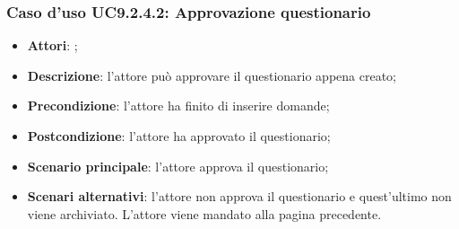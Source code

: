 			\subsubsection{Caso d'uso UC9.2.4.2: Approvazione questionario}
			\label{UC9.2.4.2}
			\begin{itemize}
				\item \textbf{Attori}: \uaupro{};
				\item \textbf{Descrizione}: l'attore può approvare il questionario appena creato;
				\item \textbf{Precondizione}:  l'attore ha finito di inserire domande;
				\item \textbf{Postcondizione}: l'attore ha approvato il questionario;
				\item \textbf{Scenario principale}: l'attore approva il questionario;
				\item \textbf{Scenari alternativi}: l'attore non approva il questionario e quest'ultimo non viene archiviato. L'attore viene mandato alla pagina precedente.
			\end{itemize}				
	 
